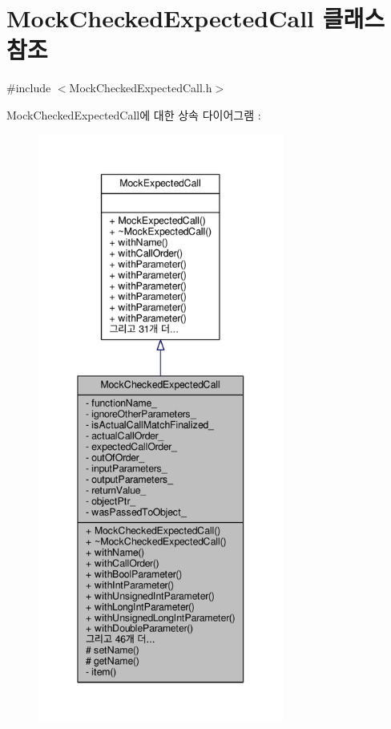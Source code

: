 \hypertarget{class_mock_checked_expected_call}{}\section{Mock\+Checked\+Expected\+Call 클래스 참조}
\label{class_mock_checked_expected_call}


{\ttfamily \#include $<$Mock\+Checked\+Expected\+Call.\+h$>$}



Mock\+Checked\+Expected\+Call에 대한 상속 다이어그램 \+: 
\nopagebreak
\begin{figure}[H]
\begin{center}
\leavevmode
\includegraphics[height=550pt]{class_mock_checked_expected_call__inherit__graph}
\end{center}
\end{figure}


